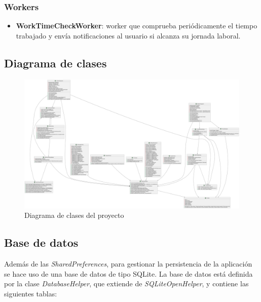 \subsubsection{Workers}
\begin{itemize}
  \item \textbf{WorkTimeCheckWorker}: worker que comprueba periódicamente el tiempo trabajado y envía notificaciones al usuario si alcanza su jornada laboral.
\end{itemize}

\subsection{Diagrama de clases}

\begin{figure}[H]
    \centering
    \includegraphics[width=1\linewidth]{root/diagrama.png}
    \caption{Diagrama de clases del proyecto}
    \label{fig:diagrama}
\end{figure}

\subsection{Base de datos}

Además de las \textit{SharedPreferences}, para gestionar la persistencia de la aplicación se hace uso de una base de datos de tipo SQLite. La base de datos está definida por la clase \textit{DatabaseHelper}, que extiende de \textit{SQLiteOpenHelper}, y contiene las siguientes tablas:

